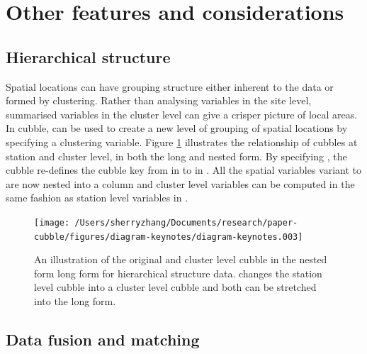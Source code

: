 \documentclass[
]{jss}
\begin{document}
\hypertarget{other-features-and-considerations}{%
\section{Other features and
considerations}\label{other-features-and-considerations}}

\hypertarget{hierarchical-structure}{%
\subsection{Hierarchical structure}\label{hierarchical-structure}}

Spatial locations can have grouping structure either inherent to the
data or formed by clustering. Rather than analysing variables in the
site level, summarised variables in the cluster level can give a crisper
picture of local areas. In cubble,  can be used to
create a new level of grouping of spatial locations by specifying a
clustering variable. Figure \ref{fig:illu-hier} illustrates the
relationship of cubbles at station and cluster level, in both the long
and nested form. By specifying
,
the cubble re-defines the cubble key from  in
 to  in . All
the spatial variables variant to  are now nested into a
 column and cluster level variables can be computed in the
same fashion as station level variables in .

\begin{CodeChunk}
\begin{figure}

{\centering \texttt{[image: /Users/sherryzhang/Documents/research/paper-cubble/figures/diagram-keynotes/diagram-keynotes.003]} 

}

\caption[An illustration of the original and cluster level cubble in the nested form long form for hierarchical structure data]{An illustration of the original and cluster level cubble in the nested form long form for hierarchical structure data.  changes the station level cubble into a cluster level cubble and both can be stretched into the long form.}\label{fig:illu-hier}
\end{figure}
\end{CodeChunk}

\hypertarget{data-fusion-and-matching}{%
\subsection{Data fusion and matching}\label{data-fusion-and-matching}}
\end{document}
